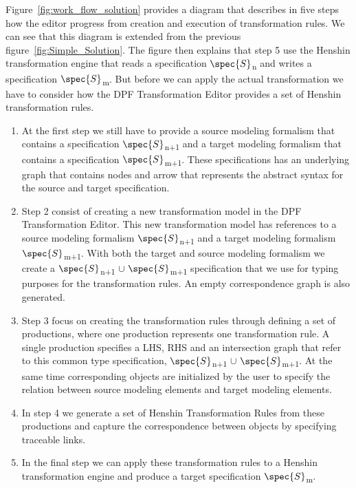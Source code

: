Figure~\ref{fig:work_flow_solution} provides a diagram that describes in five
steps how the editor progress from creation and execution of transformation
rules. We can see that this diagram is extended from the previous
figure~\ref{fig:Simple_Solution}. The figure then explains that step 5 use the
Henshin transformation engine that reads a specification
$\spec{S}$\textsubscript{n} and writes a specification
$\spec{S}$\textsubscript{m}. But before we can apply the actual transformation
we have to consider how the DPF Transformation Editor provides a set of
Henshin transformation rules.

\begin{enumerate}

\item At the first step we still have to provide a source modeling formalism
that contains a specification $\spec{S}$\textsubscript{n+1} and a target
modeling formalism that contains a specification $\spec{S}$\textsubscript{m+1}.
These specifications has an underlying graph that contains nodes and arrow that
represents the abstract syntax for the source and target specification. 

\item Step 2 consist of creating a new transformation model in the DPF
Transformation Editor. This new transformation model has references to a source
modeling formalism $\spec{S}$\textsubscript{n+1} and a target modeling formalism
$\spec{S}$\textsubscript{m+1}. With both the target and source modeling
formalism we create a $\spec{S}$\textsubscript{n+1} $\cup$
$\spec{S}$\textsubscript{m+1} specification that we use for typing
purposes for the transformation rules. An empty correspondence graph is also
generated.

\item Step 3 focus on creating the transformation rules through defining a set
of productions, where one production represents one transformation rule. A
single production specifies a LHS, RHS and an intersection graph that refer to
this common type specification,  $\spec{S}$\textsubscript{n+1} $\cup$
$\spec{S}$\textsubscript{m+1}. At the same time corresponding objects are
initialized by the user to specify the relation between source modeling elements
and target modeling elements. 

\item In step 4 we generate a set of Henshin Transformation Rules from these
productions and capture the correspondence between objects by specifying
traceable links.

\item In the final step we can apply these transformation rules to a Henshin
transformation engine and produce a target specification
$\spec{S}$\textsubscript{m}.

\end{enumerate}

